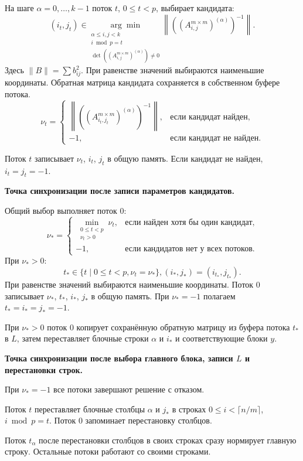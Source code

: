 \documentclass[a4paper,12pt]{article}
\newcommand{\br}[1]{\left(#1\right)}
\begin{document}
На шаге $\alpha = 0, \dots, k - 1$ поток $t$, $0 \leq t < p$, выбирает кандидата:
\[
    (i_t, j_t) \in \underset
    {\substack{\alpha \leq i,j < k \\ i \bmod p = t \\
    \det\br{\br{A_{i,j}^{m \times m}}^{(\alpha)}} \neq 0}}
    {\arg\min}
    \left\| \br{\br{A_{i,j}^{m \times m}}^{(\alpha)}}^{-1} \right\|.
\]
Здесь $\|B\| = \sum b_{ij}^2$. При равенстве значений выбираются наименьшие координаты. Обратная матрица кандидата сохраняется в собственном буфере потока.
\[
    \nu_t =
    \begin{cases}
        \left\|\br{\br{A_{i_t,j_t}^{m \times m}}^{(\alpha)}}^{-1}\right\|,
            & \text{если кандидат найден}, \\
        -1, & \text{если кандидат не найден}.
    \end{cases}
\]

Поток $t$ записывает $\nu_t$, $i_t$, $j_t$ в общую память. Если кандидат не найден, $i_t = j_t = -1$.

\textbf{Точка синхронизации после записи параметров кандидатов.}

Общий выбор выполняет поток $0$:
\[
    \nu_* =
    \begin{cases}
        \displaystyle\min_{\substack{0 \leq t < p \\ \nu_t > 0}}\nu_t,
            & \text{если найден хотя бы один кандидат}, \\
        -1, & \text{если кандидатов нет у всех потоков}.
    \end{cases}
\]
При $\nu_* > 0$:
\[
    t_* \in \{t \mid 0 \leq t < p, \nu_t = \nu_*\},
    (i_*, j_*) = (i_{t_*}, j_{t_*}).
\]
При равенстве значений выбираются наименьшие координаты. Поток $0$ записывает $\nu_*$, $t_*$, $i_*$, $j_*$ в общую память. При $\nu_* = -1$ полагаем $t_* = i_* = j_* = -1$.

При $\nu_* > 0$ поток $0$ копирует сохранённую обратную матрицу из буфера потока $t_*$ в $L$, затем переставляет блочные строки $\alpha$ и $i_*$ и соответствующие блоки $y$.

\textbf{Точка синхронизации после выбора главного блока, записи $L$ и перестановки строк.}

При $\nu_* = -1$ все потоки завершают решение с отказом.

Поток $t$ переставляет блочные столбцы $\alpha$ и $j_*$ в строках $0 \leq i < \lceil n/m \rceil$, $i \bmod p = t$. Поток $0$ запоминает перестановку столбцов.

Поток $t_\alpha$ после перестановки столбцов в своих строках сразу нормирует главную строку. Остальные потоки работают со своими строками.
\end{document}
